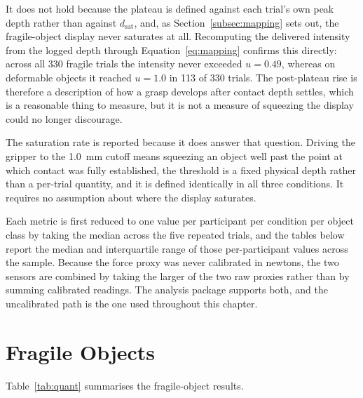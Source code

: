 \documentclass[12pt, a4paper, twoside, openright]{report}
\begin{document}
It does not hold because the plateau is defined against each trial's own peak
depth rather than against $d_{\text{sat}}$, and, as
Section~\ref{subsec:mapping} sets out, the fragile-object display never
saturates at all. Recomputing the delivered intensity from the logged depth
through Equation~\eqref{eq:mapping} confirms this directly: across all 330
fragile trials the intensity never exceeded $u = 0.49$, whereas on deformable
objects it reached $u = 1.0$ in 113 of 330 trials. The post-plateau rise is
therefore a description of how a grasp develops after contact depth settles,
which is a reasonable thing to measure, but it is not a measure of squeezing
the display could no longer discourage.

The saturation rate is reported because it does answer that question. Driving
the gripper to the \SI{1.0}{\milli\metre} cutoff means squeezing an object well
past the point at which contact was fully established, the threshold is a fixed
physical depth rather than a per-trial quantity, and it is defined identically
in all three conditions. It requires no assumption about where the display
saturates.

Each metric is first reduced to one value per participant per condition per
object class by taking the median across the five repeated trials, and the
tables below report the median and interquartile range of those per-participant
values across the sample. Because the force proxy was never calibrated in
newtons, the two sensors are combined by taking the larger of the two raw
proxies rather than by summing calibrated readings. The analysis package
supports both, and the uncalibrated path is the one used throughout this
chapter.

\section{Fragile Objects}
\label{sec:results-fragile}

Table~\ref{tab:quant} summarises the fragile-object results.
\end{document}
